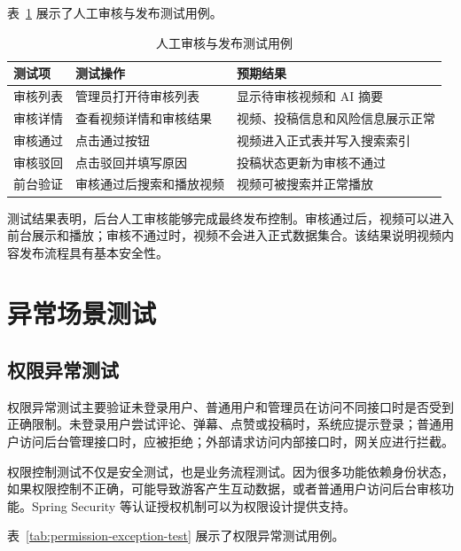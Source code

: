 表~\ref{tab:manual-audit-test} 展示了人工审核与发布测试用例。

\begin{table}[htbp]
  \centering
  \caption{人工审核与发布测试用例}
  \label{tab:manual-audit-test}
  \begin{tabular}{p{}p{}p{}}
    \hline
    \textbf{测试项} & \textbf{测试操作} & \textbf{预期结果} \\
    \hline
    审核列表 & 管理员打开待审核列表 & 显示待审核视频和 AI 摘要 \\
    审核详情 & 查看视频详情和审核结果 & 视频、投稿信息和风险信息展示正常 \\
    审核通过 & 点击通过按钮 & 视频进入正式表并写入搜索索引 \\
    审核驳回 & 点击驳回并填写原因 & 投稿状态更新为审核不通过 \\
    前台验证 & 审核通过后搜索和播放视频 & 视频可被搜索并正常播放 \\
    \hline
  \end{tabular}
\end{table}

测试结果表明，后台人工审核能够完成最终发布控制。审核通过后，视频可以进入前台展示和播放；审核不通过时，视频不会进入正式数据集合。该结果说明视频内容发布流程具有基本安全性。

\section{异常场景测试}
\label{sec:exception-test}

\subsection{权限异常测试}
\label{subsec:permission-exception-test}

权限异常测试主要验证未登录用户、普通用户和管理员在访问不同接口时是否受到正确限制。未登录用户尝试评论、弹幕、点赞或投稿时，系统应提示登录；普通用户访问后台管理接口时，应被拒绝；外部请求访问内部接口时，网关应进行拦截。

权限控制测试不仅是安全测试，也是业务流程测试。因为很多功能依赖身份状态，如果权限控制不正确，可能导致游客产生互动数据，或者普通用户访问后台审核功能。Spring Security 等认证授权机制可以为权限设计提供支持\cite{springsecuritydocs}。

表~\ref{tab:permission-exception-test} 展示了权限异常测试用例。

